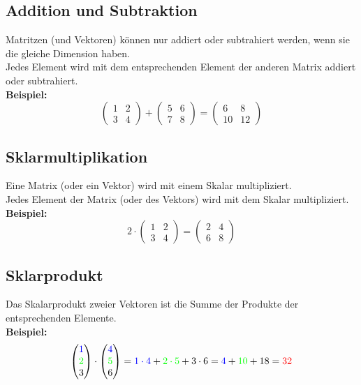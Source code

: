 \documentclass[12pt,a4paper]{article}
\begin{document}
\subsection{Addition und Subtraktion}
Matritzen (und Vektoren) können nur addiert oder subtrahiert werden, wenn sie die gleiche Dimension haben. \\
Jedes Element wird mit dem entsprechenden Element der anderen Matrix addiert oder subtrahiert. \\
\textbf{Beispiel:}
\[
\begin{pmatrix}
1 & 2 \\
3 & 4
\end{pmatrix}
+
\begin{pmatrix}
5 & 6 \\
7 & 8
\end{pmatrix}
=
\begin{pmatrix}
6 & 8 \\
10 & 12
\end{pmatrix}
\]

\subsection{Sklarmultiplikation}
Eine Matrix (oder ein Vektor) wird mit einem Skalar multipliziert. \\
Jedes Element der Matrix (oder des Vektors) wird mit dem Skalar multipliziert. \\
\textbf{Beispiel:}
\[
2 \cdot
\begin{pmatrix}
1 & 2 \\
3 & 4
\end{pmatrix}
=
\begin{pmatrix}
2 & 4 \\
6 & 8
\end{pmatrix}
\]

\subsection{Sklarprodukt}
Das Skalarprodukt zweier Vektoren ist die Summe der Produkte der entsprechenden Elemente. \\
\textbf{Beispiel:}
\[
\begin{pmatrix}
\textcolor{blue}{1} \\
\textcolor{green}{2} \\
3
\end{pmatrix}
\cdot
\begin{pmatrix}
\textcolor{blue}{4} \\
\textcolor{green}{5} \\
6
\end{pmatrix}
=
\textcolor{blue}{1 \cdot 4} + \textcolor{green}{2 \cdot 5} + 3 \cdot 6
=
\textcolor{blue}{4} + \textcolor{green}{10} + 18
=
\textcolor{red}{32}
\]
\end{document}
